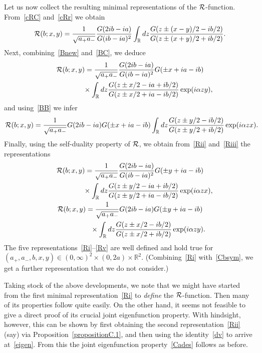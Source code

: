 \documentclass[11pt]{article}
\numberwithin{equation}{section}
\newcommand{\R}{{\mathbb R}}
\newcommand{\cR}{{\cal R}}
\newcommand{\aaa}{a_{+},a_{-}}
\begin{document}
Let us now collect the resulting minimal representations of the $\cR$-function. From~\eqref{cRC} and~\eqref{cRr} we obtain
\begin{gather}\label{Ri}
\cR(b;x,y)=\frac{1}{\sqrt{a_+a_-}}\frac{G(2ib-ia)}{G(ib-ia)^2}
\int_{\R}dz \frac{G(z\pm (x-y)/2-ib/2)}{G(z\pm (x+y)/2+ib/2)}.
\end{gather}
Next, combining~\eqref{Bnew} and~\eqref{BC}, we deduce
\begin{gather}
\cR(b;x,y)=\frac{1}{\sqrt{a_+a_-}}\frac{G(2ib-ia)}{G(ib-ia)^2}
G(\pm x +ia-ib)\nonumber\\
\phantom{\cR(b;x,y)=}{} \times
\int_{\R}dz\frac{G(z\pm x/2-ia+ib/2)}{G(z\pm x/2+ia-ib/2)}\exp(i\alpha zy),\label{Rii}
\end{gather}
and using~\eqref{BB} we infer
\begin{gather}\label{Riii}
\cR(b;x,y)=\frac{1}{\sqrt{a_+a_-}}G(2ib-ia)
G(\pm x +ia-ib)
\int_{\R}dz\frac{G(z\pm y/2-ib/2)}{G(z\pm y/2+ib/2)}\exp(i\alpha zx).\!\!\!
\end{gather}
Finally, using the self-duality property of $\cR$, we obtain from~\eqref{Rii} and~\eqref{Riii} the representations
\begin{gather}
\cR(b;x,y)=\frac{1}{\sqrt{a_+a_-}}\frac{G(2ib-ia)}{G(ib-ia)^2}
G(\pm y +ia-ib)\nonumber\\
\phantom{\cR(b;x,y)=}{}\times
\int_{\R}dz\frac{G(z\pm y/2-ia+ib/2)}{G(z\pm y/2+ia-ib/2)}\exp(i\alpha zx),\label{Riv}
\\
\cR(b;x,y)=\frac{1}{\sqrt{a_+a_-}}G(2ib-ia)
G(\pm y +ia-ib)\nonumber\\
\phantom{\cR(b;x,y)=}{}\times
\int_{\R}dz\frac{G(z\pm x/2-ib/2)}{G(z\pm x/2+ib/2)}\exp(i\alpha zy).\label{Rv}
\end{gather}
The f\/ive representations~\eqref{Ri}--\eqref{Rv} are well def\/ined and hold true for $(\aaa,b,x,y)\in(0,\infty)^2\times(0,2a)\times\R^2$. (Combining~\eqref{Ri} with~\eqref{Cbsym}, we get a further representation that we do not consider.)

Taking stock of the above developments, we note that we might have started from the f\/irst minimal representation~\eqref{Ri} to {\em define} the $\cR$-function. Then many of its properties follow quite easily. On the other hand, it seems not feasible to give a direct proof of its crucial joint eigenfunction property. With hindsight, however, this can be shown by f\/irst obtaining the second representation~\eqref{Rii} (say) via Proposition~\ref{propositionC.1}, and then using the identity~\eqref{dv} to arrive at~\eqref{eigen}. From this the joint eigenfunction property~\eqref{Cades} follows as before.
\setcounter{section}{6}
\setcounter{subsection}{0}
\setcounter{subsubsection}{0}
\setcounter{equation}{26}
\appendix
\end{document}
